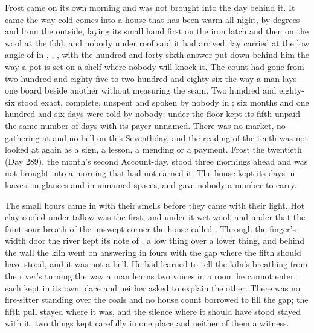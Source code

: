 
Frost came on its own morning and was not brought into the day behind it. It came the way cold comes into a house that has been warm all night, by degrees and from the outside, laying its small hand first on the iron latch and then on the wool at the fold, and nobody under  roof said it had arrived.  lay carried at the low angle of  in , , , with the hundred and forty-sixth answer put down behind him the way a pot is set on a shelf where nobody will knock it. The count had gone from two hundred and eighty-five to two hundred and eighty-six the way a man lays one board beside another without measuring the seam. Two hundred and eighty-six stood exact, complete, unspent and spoken by nobody in ; six months and one hundred and six days were told by nobody; under the floor  kept its fifth unpaid the same number of days with its payer unnamed. There was no market, no gathering at  and no bell on this Seventhday, and the reading of the tenth was not looked at again as a sign, a lesson, a mending or a payment. Frost the twentieth (Day 289), the month's second Account-day, stood three mornings ahead and was not brought into a morning that had not earned it. The house kept its days in loaves, in glances and in unnamed spaces, and gave nobody a number to carry.

The small hours came in with their smells before they came with their light. Hot clay cooled under tallow was the first, and under it wet wool, and under that the faint sour breath of the unswept corner the house called . Through the finger's-width door the river kept its note of , a low thing over a lower thing, and behind the wall the kiln went on answering in fours with the gap where the fifth should have stood, and it was not a bell. He had learned to tell the kiln's breathing from the river's turning the way a man learns two voices in a room he cannot enter, each kept in its own place and neither asked to explain the other. There was no fire-sitter standing over the coals and no house count borrowed to fill the gap; the fifth pull stayed where it was, and the silence where it should have stood stayed with it, two things kept carefully in one place and neither of them a witness.

